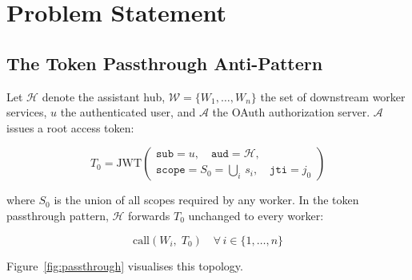 \documentclass[journal]{IEEEtran}
\begin{document}
\section{Problem Statement}
\label{sec:problem}

\subsection{The Token Passthrough Anti-Pattern}

Let $\mathcal{H}$ denote the assistant hub, $\mathcal{W}=\{W_1,\ldots,W_n\}$ the
set of downstream worker services, $u$ the authenticated user, and $\mathcal{A}$
the OAuth authorization server. $\mathcal{A}$ issues a root access token:

\begin{equation}
T_0 = \mathrm{JWT}\!\left(\begin{array}{l}
  \texttt{sub} = u,\quad \texttt{aud} = \mathcal{H},\\[2pt]
  \texttt{scope} = S_0 = \textstyle\bigcup_{i}\, s_i,\quad
  \texttt{jti} = j_0
\end{array}\right)
\label{eq:root}
\end{equation}

where $S_0$ is the union of all scopes required by any worker. In the token
passthrough pattern, $\mathcal{H}$ forwards $T_0$ unchanged to every worker:

\begin{equation}
\mathrm{call}(W_i,\; T_0) \quad \forall\, i \in \{1, \ldots, n\}
\label{eq:passthrough}
\end{equation}

Figure~\ref{fig:passthrough} visualises this topology.
\end{document}
